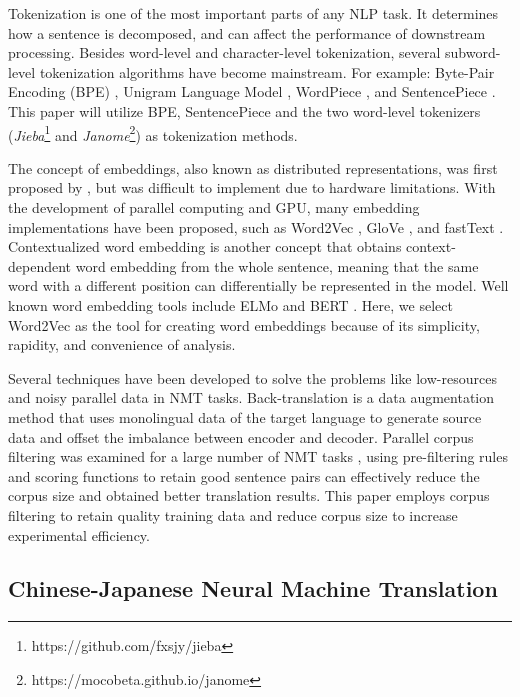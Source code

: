 Tokenization is one of the most important parts of any NLP task. It determines how a sentence is decomposed, and can affect the performance of downstream processing. Besides word-level and character-level tokenization, several subword-level tokenization algorithms have become mainstream. For example: Byte-Pair Encoding (BPE) \cite{sennrich_neural_2016}, Unigram Language Model \cite{kudo-2018-subword}, WordPiece \cite{6289079}, and SentencePiece \cite{kudo-richardson-2018-sentencepiece}. This paper will utilize BPE, SentencePiece \cite{sennrich_neural_2016, kudo-richardson-2018-sentencepiece} and the two word-level tokenizers (\textit{Jieba}\footnote{https://github.com/fxsjy/jieba} and \textit{Janome}\footnote{https://mocobeta.github.io/janome}) as tokenization methods.

The concept of embeddings, also known as distributed representations, was first proposed by \cite{hinton1986learning, bengio2003neural}, but was difficult to implement due to hardware limitations. With the development of parallel computing and GPU, many embedding implementations have been proposed, such as Word2Vec \cite{mikolov2013efficient}, GloVe \cite{pennington2014glove}, and fastText \cite{bojanowski2017enriching}. Contextualized word embedding is another concept that obtains context-dependent word embedding from the whole sentence, meaning that the same word with a different position can differentially be represented in the model. Well known word embedding tools include ELMo \cite{peters-etal-2018-deep} and BERT \cite{devlin-etal-2019-bert}. Here, we select Word2Vec \cite{mikolov2013efficient} as the tool for creating word embeddings because of its simplicity, rapidity, and convenience of analysis.

Several techniques have been developed to solve the problems like low-resources and noisy parallel data in NMT tasks. Back-translation \cite{sennrich-etal-2016-improving} is a data augmentation method that uses monolingual data of the target language to generate source data and offset the imbalance between encoder and decoder. Parallel corpus filtering was examined for a large number of NMT tasks \cite{koehn2018findings}, using pre-filtering rules and scoring functions to retain good sentence pairs can effectively reduce the corpus size and obtained better translation results. This paper employs corpus filtering to retain quality training data and reduce corpus size to increase experimental efficiency.

\subsection{Chinese-Japanese Neural Machine Translation}


